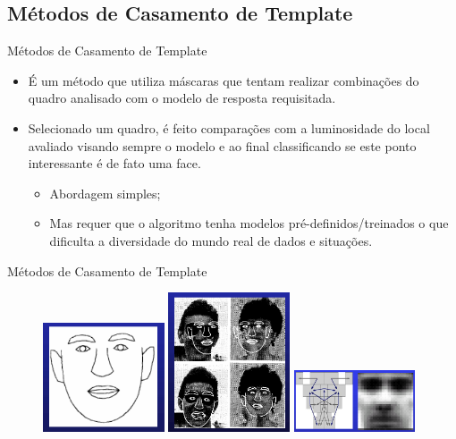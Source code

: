 \documentclass[aspectratio=169, xcolor=dvipsnames]{beamer}
\let\olditem=\item%
\renewcommand{\item}{\olditem \justifying}
\begin{document}
\subsection{Métodos de Casamento de Template}
\begin{frame}{Métodos de Casamento de Template}
	\begin{itemize}
		\setlength{\itemsep}{1.5em}
		\item É um método que utiliza máscaras que tentam realizar combinações do quadro analisado com o modelo de resposta requisitada. 
		
		\item Selecionado um quadro, é feito comparações com a luminosidade do local avaliado visando sempre o modelo e ao final classificando se este ponto interessante é de fato uma face. 
		\begin{itemize}
			\setlength{\itemsep}{1em}
			\item Abordagem simples;
			\item Mas requer que o algoritmo tenha modelos pré-definidos/treinados o que dificulta a diversidade do mundo real de dados e situações.
		\end{itemize}
	\end{itemize}
\end{frame}

\begin{frame}{Métodos de Casamento de Template}
	\begin{figure}
		\centering
		\label{fig:inst}
		\includegraphics[width=0.32\textwidth]{img/m2-1.png}\pause
		\includegraphics[width=0.32\textwidth]{img/m2-2.png}\pause
		\includegraphics[width=0.32\textwidth]{img/m2-3.png}
	\end{figure}
\end{frame}
\end{document}
